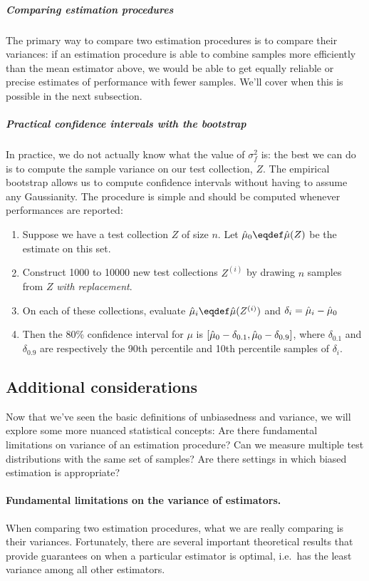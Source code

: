 \subparagraph{Comparing estimation procedures}
The primary way to compare two estimation procedures is to compare their variances: if an estimation procedure is able to combine samples more efficiently than the mean estimator above, we would be able to get equally reliable or precise estimates of performance with fewer samples.
We'll cover when this is possible in the next subsection.

\subparagraph{Practical confidence intervals with the bootstrap}
In practice, we do not actually know what the value of $\sigma^2_f$ is: the best we can do is to compute the sample variance on our test collection, $Z$.
The empirical bootstrap allows us to compute confidence intervals without having to assume any Gaussianity.
The procedure is simple and should be computed whenever performances are reported:
\begin{enumerate}
  \item Suppose we have a test collection $Z$ of size $n$. Let $\muh_0 \eqdef \muh(Z)$ be the estimate on this set.
  \item Construct 1000 to 10000 new test collections $Z^{(i)}$ by drawing $n$ samples from $Z$ \textit{with replacement}.
  \item On each of these collections, evaluate $\muh_{i} \eqdef \muh(Z^{(i)})$ and $\delta_i = \hat{\mu}_i - \hat{\mu}_0$
  \item Then the 80\% confidence interval for $\mu$ is $[\hat{\mu}_0 - \delta_{0.1}, \hat{\mu}_0 - \delta_{0.9}]$, where $\delta_{0.1}$ and $\delta_{0.9}$ are respectively the 90th percentile and 10th percentile samples of $\delta_i$. 
\end{enumerate}

\subsection{Additional considerations}
Now that we've seen the basic definitions of unbiasedness and variance, we will explore some more nuanced statistical concepts:
  Are there fundamental limitations on variance of an estimation procedure?
  Can we measure multiple test distributions with the same set of samples?
  Are there settings in which biased estimation is appropriate? 

\paragraph{Fundamental limitations on the variance of estimators.}
When comparing two estimation procedures, what we are really comparing is their variances.
Fortunately, there are several important theoretical results that provide guarantees on when a particular estimator is optimal, i.e.\ has the least variance among all other estimators.

